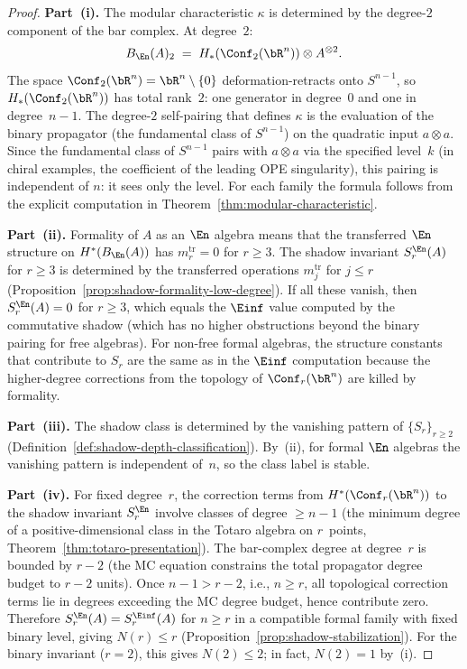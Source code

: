 \begin{proof}
\textbf{Part~(i).}
The modular characteristic $\kappa$ is determined by the degree-$2$
component of the bar complex. At degree~$2$:
\[
B_{\En}(A)_2
\;=\;
H_*(\Conf_2(\bR^n)) \otimes A^{\otimes 2}.
\]
The space $\Conf_2(\bR^n) = \bR^n \setminus \{0\}$ deformation-retracts
onto $S^{n-1}$, so $H_*(\Conf_2(\bR^n))$ has total rank~$2$:
one generator in degree~$0$ and one in degree~$n-1$. The
degree-$2$ self-pairing that defines $\kappa$ is the evaluation of
the binary propagator (the fundamental class of $S^{n-1}$) on
the quadratic input $a \otimes a$. Since the fundamental class of
$S^{n-1}$ pairs with $a \otimes a$ via the specified level~$k$
(in chiral examples, the coefficient of the leading OPE singularity),
this pairing is independent of $n$: it sees only the level.
For each family the formula follows from the explicit computation
in Theorem~\ref{thm:modular-characteristic}.

\textbf{Part~(ii).}
Formality of $A$ as an $\En$ algebra means that the transferred
$\En$ structure on $H^*(B_{\En}(A))$ has $m_r^{\mathrm{tr}} = 0$
for $r \geq 3$. The shadow invariant $S_r^{\En}(A)$ for $r \geq 3$
is determined by the transferred operations $m_j^{\mathrm{tr}}$
for $j \leq r$ (Proposition~\ref{prop:shadow-formality-low-degree}).
If all these vanish, then $S_r^{\En}(A) = 0$ for $r \geq 3$,
which equals the $\Einf$ value computed by the commutative shadow
(which has no higher obstructions beyond the binary pairing for free algebras).
For non-free formal algebras, the structure constants that
contribute to $S_r$ are the same as in the $\Einf$ computation
because the higher-degree corrections from the topology of
$\Conf_r(\bR^n)$ are killed by formality.

\textbf{Part~(iii).}
The shadow class is determined by the vanishing pattern of
$\{S_r\}_{r \geq 2}$ (Definition~\ref{def:shadow-depth-classification}).
By~(ii), for formal $\En$ algebras the vanishing pattern is
independent of~$n$, so the class label is stable.

\textbf{Part~(iv).}
For fixed degree~$r$, the correction terms from
$H^*(\Conf_r(\bR^n))$ to the shadow invariant $S_r^{\En}$ involve
classes of degree $\geq n - 1$ (the minimum degree of a
positive-dimensional class in the Totaro algebra on $r$~points,
Theorem~\ref{thm:totaro-presentation}). The bar-complex degree
at degree~$r$ is bounded by $r - 2$ (the MC equation constrains
the total propagator degree budget to $r - 2$ units).
Once $n - 1 > r - 2$, i.e., $n \geq r$, all topological
correction terms lie in degrees exceeding the MC degree budget,
hence contribute zero. Therefore
$S_r^{\En}(A) = S_r^{\Einf}(A)$ for $n \geq r$ in a compatible
formal family with fixed binary level,
giving $N(r) \leq r$
(Proposition~\ref{prop:shadow-stabilization}).
For the binary invariant ($r = 2$),
this gives $N(2) \leq 2$; in fact, $N(2) = 1$ by~(i).
\end{proof}

